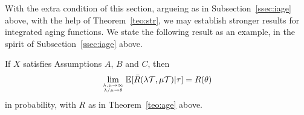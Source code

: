 \begin{rmk}
\label{rmk:striage}
With the extra condition of this section, argueing as in Subsection~\ref{ssec:iage} above, with the help of Theorem~\ref{teo:str}, 
we may establish stronger results for integrated aging functions. We state the following result as an example,
in the spirit of Subsection~\ref{ssec:iage} above.
\begin{theo}
\label{teo:striage}
If $X$ satisfies Assumptions  $A$, $B$ and $C$, then 
\begin{equation}
\label{eq:striage}
\lim_{\lambda,\mu\to\infty\atop{\lambda/\mu\to\theta}}\esp[\bar R(\lambda{\mathcal T},\mu {\mathcal T})|\tau]=R(\theta)
\end{equation}
in probability, with $R$ as in Theorem~\ref{teo:age} above.
\end{theo}




\end{rmk}






